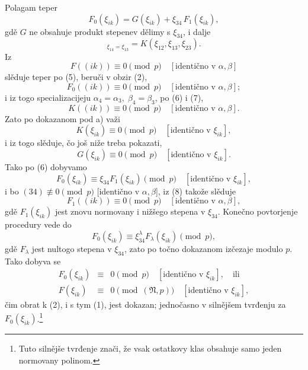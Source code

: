 \documentclass[11pt]{article}
\providecommand{\frN}{\mathfrak N}
\begin{document}
Polagam teper
\begin{equation}
        F_0(\xi_{ik})=G(\xi_{ik})+\xi_{34}\,F_1(\xi_{ik}),
\end{equation}
gdě \(G\) ne obsahuje produkt stepenev dělimy s \(\xi_{34}\), i dalje
\begin{equation}
        [G]_{\xi_{14}=\xi_{13}}=K(\xi_{12},\xi_{13},\xi_{23}).
\end{equation}
Iz
\[
        F((ik))\equiv0\pmod p\quad[\text{identično v \(\alpha,\beta\)}]
\]
slěduje teper po (5), beruči v obzir (2),
\begin{equation}
        F_0((ik))\equiv0\pmod p\quad [\text{identično v \(\alpha,\beta\)}];
\end{equation}
i iz togo specializacijeju \(\alpha_4=\alpha_3,\;\beta_4=\beta_3\), po (6) i (7),
\[
        K((ik))\equiv0\pmod p\quad [\text{identično v \(\alpha,\beta\)}].
\]
Zato po dokazanom pod a) važi
\[
        K(\xi_{ik})\equiv0\pmod p\quad [\text{identično v \(\xi_{ik}\)}],
\]
i iz togo slěduje, čo još niže treba pokazati,
\[
        G(\xi_{ik})\equiv0\pmod p\quad [\text{identično v \(\xi_{ik}\)}].
\]
Tako po (6) dobyvamo
\[
        F_0(\xi_{ik})\equiv\xi_{34}F_1(\xi_{ik})\pmod p\quad [\text{identično v \(\xi_{ik}\)}],
\]
i bo \((34)\not\equiv0\pmod p\) [identično v \(\alpha,\beta\)], iz (8) takože slěduje
\[
        F_1((ik))\equiv0\pmod p\quad [\text{identično v \(\alpha,\beta\)}],
\]
gdě \(F_1(\xi_{ik})\) jest znovu normovany i nižšego stepena v \(\xi_{34}\). Konečno povtorjenje procedury vede do
\[
        F_0(\xi_{ik})\equiv\xi_{34}^{\lambda}F_\lambda(\xi_{ik})\pmod p,
\]
gdě \(F_\lambda\) jest nultogo stepena v \(\xi_{34}\), zato po točno dokazanom izčezaje modulo \(p\). Tako dobyva se
\begin{equation}
\begin{array}{rcl}
        F_0(\xi_{ik})&\equiv&0\pmod p\quad [\text{identično v \(\xi_{ik}\)}],\quad\text{ili}\\
        F(\xi_{ik})&\equiv&0\pmod{(\frN,p)}\quad [\text{identično v \(\xi_{ik}\)}],
\end{array}
\end{equation}
čim obrat k (2), i s tym (1), jest dokazan; jednočasno v silnějšem tvrđenju za \(F_0(\xi_{ik})\).\footnote{Tuto silnějše tvrđenje znači, že vsak ostatkovy klas obsahuje samo jeden normovany polinom.}
\end{document}
